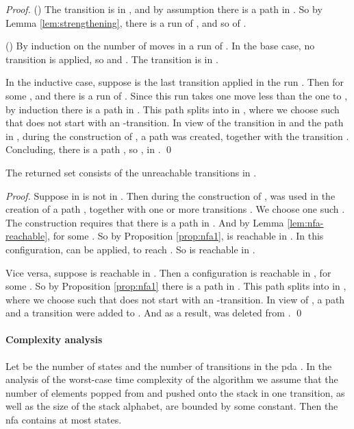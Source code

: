 \documentclass{llncs}
\begin{document}
\begin{proof}
()
The transition  is in , and by assumption there is a path  in .
So by Lemma \ref{lem:strengthening}, there is a run  of , and so of .

\vspace{2mm}

\noindent
() By induction on the number of moves in a run  of .
In the base case, no transition is applied, so  and .
The transition  is in .

In the inductive case, suppose  is the last transition applied in the run .
Then  for some , and there is a run  of . Since this run
takes one move less than the one to , by induction there is a path  in .
This path splits into  in , where we choose  such that
 does not start with an -transition.
In view of the transition  in  and the path  in ,
during the construction of , a path  was created, together with
the transition . Concluding, there is a path ,
so , in .
\qed
\end{proof}

\begin{theorem}
\label{thm:nfa1}
The returned set  consists of the unreachable transitions in .
\end{theorem}

\begin{proof}
Suppose  in  is not in . Then during the construction of ,
 was used in the creation of a path , together with one or more transitions
. We choose one such . The construction requires that there is a path 
in . And by Lemma \ref{lem:nfa-reachable},  for some . So by Proposition \ref{prop:nfa1},
 is reachable in . In this configuration,  can be applied, to reach .
So  is reachable in .

Vice versa, suppose  is reachable in . Then a configuration  is reachable in , for some .
So by Proposition \ref{prop:nfa1} there is a path  in .
This path splits into  in , where we choose  such that
 does not start with an -transition.
In view of , a path  and a transition  were added to .
And as a result,  was deleted from .
\qed
\end{proof}

\paragraph{Complexity analysis}
Let  be the number of states and  the number of transitions in the pda .
In the analysis of the worst-case time complexity of the algorithm we assume that the number of elements popped from and
pushed onto the stack in one transition, as well as the size of the stack alphabet, are bounded by some constant.
Then the nfa  contains at most  states.
\end{document}

